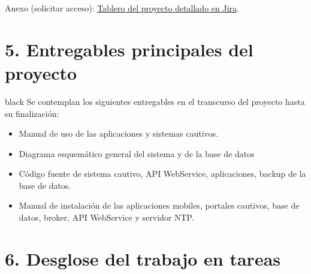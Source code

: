 \documentclass[11pt]{charter}
\begin{document}
\begin{landscape}
Anexo (solicitar acceso): \href{https://kathemica.atlassian.net/secure/RapidBoard.jspa?rapidView=1&projectKey=PG&view=planning&selectedIssue=PG-41&issueLimit=100&atlOrigin=eyJpIjoiNzljYTRhZmNiZDZmNDE2YTlhMTcxM2Q0ZDJkZjQ3OTciLCJwIjoiaiJ9}{Tablero del proyecto detallado en Jira}.


\end{landscape}


\section{5. Entregables principales del proyecto}
\label{sec:entregables}

\begin{consigna}{black}
Se contemplan los siguientes entregables en el transcurso del proyecto hasta su finalización: 
	\begin{itemize}
		\item Manual de uso de las aplicaciones y sistemas cautivos.
		\item Diagrama esquemático general del sistema y de la base de datos
		\item Código fuente de sistema cautivo, API WebService, aplicaciones, backup de la  base de datos.
		\item Manual de instalación de las aplicaciones mobiles, portales cautivos, base de datos, broker, API WebService y servidor NTP.
	\end{itemize}
\end{consigna}


\section{6. Desglose del trabajo en tareas}
\label{sec:wbs}
\end{document}

